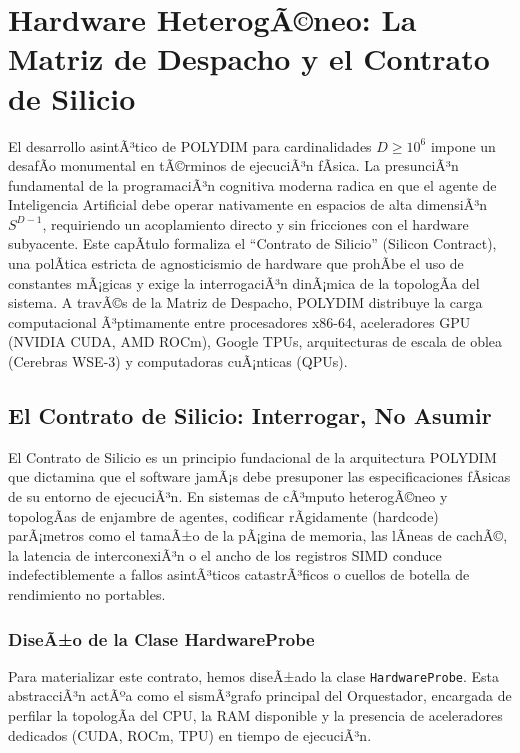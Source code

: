 ﻿\chapter{Hardware HeterogÃ©neo: La Matriz de Despacho y el Contrato de Silicio}


El desarrollo asintÃ³tico de POLYDIM para cardinalidades \(D \ge 10^6\) impone un desafÃ­o monumental en tÃ©rminos de ejecuciÃ³n fÃ­sica. La presunciÃ³n fundamental de la programaciÃ³n cognitiva moderna radica en que el agente de Inteligencia Artificial debe operar nativamente en espacios de alta dimensiÃ³n \(S^{D-1}\), requiriendo un acoplamiento directo y sin fricciones con el hardware subyacente. Este capÃ­tulo formaliza el ``Contrato de Silicio'' (Silicon Contract), una polÃ­tica estricta de agnosticismio de hardware que prohÃ­be el uso de constantes mÃ¡gicas y exige la interrogaciÃ³n dinÃ¡mica de la topologÃ­a del sistema. A travÃ©s de la Matriz de Despacho, POLYDIM distribuye la carga computacional Ã³ptimamente entre procesadores x86-64, aceleradores GPU (NVIDIA CUDA, AMD ROCm), Google TPUs, arquitecturas de escala de oblea (Cerebras WSE-3) y computadoras cuÃ¡nticas (QPUs).

\section{El Contrato de Silicio: Interrogar, No Asumir}


El Contrato de Silicio es un principio fundacional de la arquitectura POLYDIM que dictamina que el software jamÃ¡s debe presuponer las especificaciones fÃ­sicas de su entorno de ejecuciÃ³n. En sistemas de cÃ³mputo heterogÃ©neo y topologÃ­as de enjambre de agentes, codificar rÃ­gidamente (hardcode) parÃ¡metros como el tamaÃ±o de la pÃ¡gina de memoria, las lÃ­neas de cachÃ©, la latencia de interconexiÃ³n o el ancho de los registros SIMD conduce indefectiblemente a fallos asintÃ³ticos catastrÃ³ficos o cuellos de botella de rendimiento no portables.

\subsection{DiseÃ±o de la Clase HardwareProbe}
Para materializar este contrato, hemos diseÃ±ado la clase \texttt{HardwareProbe}. Esta abstracciÃ³n actÃºa como el sismÃ³grafo principal del Orquestador, encargada de perfilar la topologÃ­a del CPU, la RAM disponible y la presencia de aceleradores dedicados (CUDA, ROCm, TPU) en tiempo de ejecuciÃ³n. 

